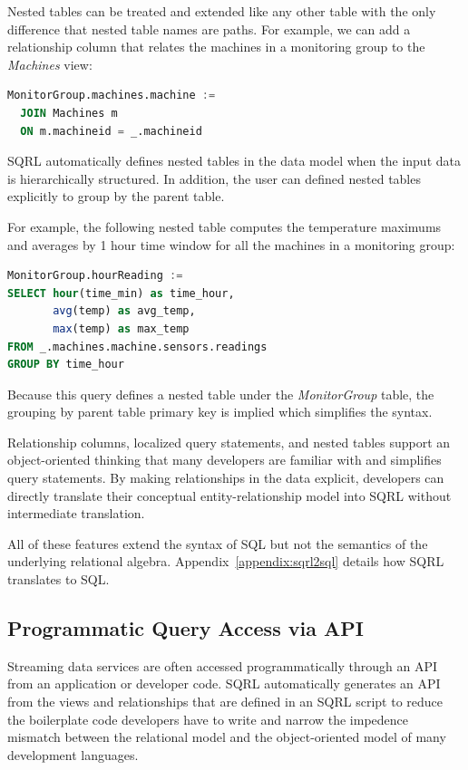 \documentclass[	DIV=calc,%
							paper=letter,%
							fontsize=11pt,%
							twocolumn]{scrartcl}	 					%
\begin{document}
Nested tables can be treated and extended like any other table with the only difference that nested table names are paths. For example, we can add a relationship column that relates the machines in a monitoring group to the \emph{Machines} view:
\begin{lstlisting}[language=SQL]
MonitorGroup.machines.machine :=
  JOIN Machines m
  ON m.machineid = _.machineid
\end{lstlisting}

SQRL automatically defines nested tables in the data model when the input data is hierarchically structured. In addition, the user can defined nested tables explicitly to group by the parent table.

For example, the following nested table computes the temperature maximums and averages by 1 hour time window for all the machines in a monitoring group:
\begin{lstlisting}[language=SQL]
MonitorGroup.hourReading :=
SELECT hour(time_min) as time_hour,
       avg(temp) as avg_temp,
       max(temp) as max_temp
FROM _.machines.machine.sensors.readings
GROUP BY time_hour
\end{lstlisting}

Because this query defines a nested table under the \emph{MonitorGroup} table, the grouping by parent table primary key is implied which simplifies the syntax.

Relationship columns, localized query statements, and nested tables support an object-oriented thinking that many developers are familiar with and simplifies query statements. By making relationships in the data explicit, developers can directly translate their conceptual entity-relationship model into SQRL without intermediate translation.

All of these features extend the syntax of SQL but not the semantics of the underlying relational algebra. Appendix~\ref{appendix:sqrl2sql} details how SQRL translates to SQL.

\subsection{Programmatic Query Access via API}

Streaming data services are often accessed programmatically through an API from an application or developer code. SQRL automatically generates an API from the views and relationships that are defined in an SQRL script to reduce the boilerplate code developers have to write and narrow the impedence mismatch between the relational model and the object-oriented model of many development languages.
\end{document}
